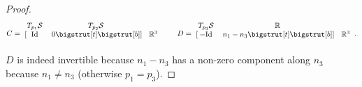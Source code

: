 \documentclass[11pt]{article}
\newcommand{\R}{\mathbb{R}}
\newcommand{\Surf}{\mathcal{S}}
\newcommand{\Id}{\mathrm{Id}}
\newcommand\topstrut[1][1.2ex]{\setlength\bigstrutjot{#1}{\bigstrut[t]}}
\newcommand\botstrut[1][1.2ex]{\setlength\bigstrutjot{#1}{\bigstrut[b]}}
\theoremstyle{plain}
\theoremstyle{definition}
\theoremstyle{remark}
\begin{document}
\begin{proof}
		\[
		C = 
		\begin{blockarray}{ccl}
			\begin{block}{ccl}
				T_{p_1} \Surf & T_{p_2} \Surf & \\
			\end{block}
			\begin{block}{[cc] l}
				\Id & 0 \topstrut \botstrut & \R^3 \\
			\end{block}
		\end{blockarray}
		\qquad
		D = 
		\begin{blockarray}{ccl}
			\begin{block}{ccl}
				T_{p_3} \Surf & \R & \\
			\end{block}
			\begin{block}{[cc] l}
				-\Id & n_1 - n_3 \topstrut \botstrut & \R^3 \\
			\end{block}
		\end{blockarray}.
		\]
		$D$ is indeed invertible because $n_1 - n_3$ has a non-zero component along $n_3$ because $n_1 \neq n_3$ (otherwise $p_1 = p_3$). 
		

\end{proof}
\end{document}
